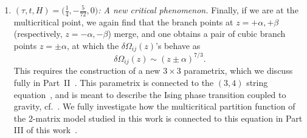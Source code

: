 \documentclass[10pt,a4paper]{amsart}
\numberwithin{equation}{section}
\begin{document}
\begin{Remark}
\begin{enumerate}
 \item[$(6)$] \textit{$(\tau,t,H) = \bigl(\frac{1}{4},-\frac{5}{72},0\bigr)$: A new critical phenomenon.}
 Finally, if we are at the multicritical point, we again find that the branch points at $z=+\alpha,+\beta$
 (respectively, $z=-\alpha,-\beta$) merge, and one obtains a pair of cubic branch points $z=\pm \alpha$, at which the $\delta\Omega_{ij}(z)$'s
 behave as
 \begin{equation*}
 \delta \Omega_{ij}(z) \sim (z\pm \alpha)^{7/3}.
 \end{equation*}
 This requires the construction of a new $3\times 3$ parametrix, which we discuss fully in Part~II~\cite{DHL2}. This parametrix is connected to the $(3,4)$ string equation~\cite{Douglas1}, and is meant to describe the Ising phase transition coupled to gravity, cf.~\cite{KB,DS,GM1,GM2}. We fully investigate how the multicritical partition function of the 2-matrix model studied in this work is connected
 to this equation in Part III of this work~\cite{DHL3}.
 \end{enumerate}
\end{Remark}
\end{document}

